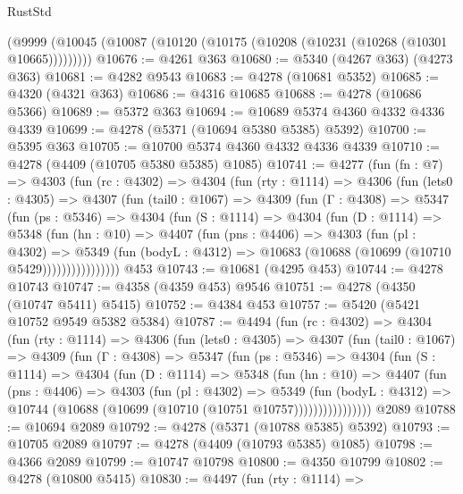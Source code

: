 \begin{lexlean}{RustStd}
\begin{coremodule}
{\begin{coremodule}
{{{{{{{{{{{{{{{{{{{{{{{{{{{{{{{{{{{    (@9999 (@10045 (@10087 (@10120 (@10175 (@10208 (@10231 (@10268 (@10301 @10665)))))))))
@10676 := @4261 @363
@10680 := @5340 (@4267 @363) (@4273 @363)
@10681 := @4282 @9543
@10683 := @4278 (@10681 @5352)
@10685 := @4320 (@4321 @363)
@10686 := @4316 @10685
@10688 := @4278 (@10686 @5366)
@10689 := @5372 @363
@10694 := @10689 @5374 @4360 @4332 @4336 @4339
@10699 := @4278 (@5371 (@10694 @5380 @5385) @5392)
@10700 := @5395 @363
@10705 := @10700 @5374 @4360 @4332 @4336 @4339
@10710 := @4278 (@4409 (@10705 @5380 @5385) @1085)
@10741 := @4277
    (fun (fn : @7) =>
    @4303
      (fun (rc : @4302) =>
      @4304
        (fun (rty : @1114) =>
        @4306
          (fun (lets0 : @4305) =>
          @4307
            (fun (tail0 : @1067) =>
            @4309
              (fun (Γ : @4308) =>
              @5347
                (fun (ps : @5346) =>
                @4304
                  (fun (S : @1114) =>
                  @4304
                    (fun (D : @1114) =>
                    @5348
                      (fun (hn : @10) =>
                      @4407
                        (fun (pns : @4406) =>
                        @4303
                          (fun (pl : @4302) =>
                          @5349
                            (fun (bodyL : @4312) =>
                            @10683 (@10688 (@10699 (@10710 @5429))))))))))))))))
    @453
@10743 := @10681 (@4295 @453)
@10744 := @4278 @10743
@10747 := @4358 (@4359 @453) @9546
@10751 := @4278 (@4350 (@10747 @5411) @5415)
@10752 := @4384 @453
@10757 := @5420 (@5421 @10752 @9549 @5382 @5384)
@10787 := @4494
    (fun (rc : @4302) =>
    @4304
      (fun (rty : @1114) =>
      @4306
        (fun (lets0 : @4305) =>
        @4307
          (fun (tail0 : @1067) =>
          @4309
            (fun (Γ : @4308) =>
            @5347
              (fun (ps : @5346) =>
              @4304
                (fun (S : @1114) =>
                @4304
                  (fun (D : @1114) =>
                  @5348
                    (fun (hn : @10) =>
                    @4407
                      (fun (pns : @4406) =>
                      @4303
                        (fun (pl : @4302) =>
                        @5349
                          (fun (bodyL : @4312) =>
                          @10744 (@10688 (@10699 (@10710 (@10751 @10757))))))))))))))))
    @2089
@10788 := @10694 @2089
@10792 := @4278 (@5371 (@10788 @5385) @5392)
@10793 := @10705 @2089
@10797 := @4278 (@4409 (@10793 @5385) @1085)
@10798 := @4366 @2089
@10799 := @10747 @10798
@10800 := @4350 @10799
@10802 := @4278 (@10800 @5415)
@10830 := @4497
    (fun (rty : @1114) =>
}}}}}}}}}}}}}}}}}}}}}}}}}}}}}}}}}}}
\end{coremodule}}
\end{coremodule}
\end{lexlean}
